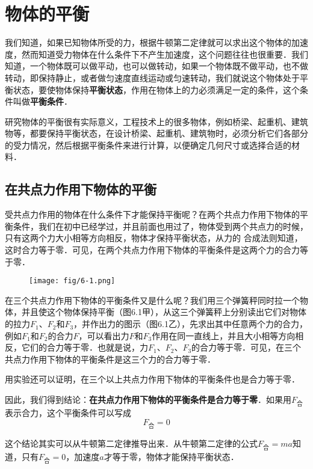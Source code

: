 

\chapter{物体的平衡}

我们知道，如果已知物体所受的力，根据牛顿第二定律就可以求出这个物体的加速度，然而知道受力物体在什么条件下不产生加速度，这个问题往往也很重要．我们知道，一个物体既可以做平动，也可以做转动，如果一个物体既不做平动，也不做转动，即保持静止，或者做匀速度直线运动或匀速转动，我们就说这个物体处于平衡状态，要使物体保持\textbf{平衡状态}，作用在物体上的力必须满足一定的条件，这个条件叫做\textbf{平衡条件}．

研究物体的平衡很有实际意义，工程技术上的很多物体，例如桥梁、起重机、建筑物等，都要保持平衡状态，在设计桥梁、起重机、建筑物时，必须分析它们各部分的受力情况，然后根据平衡条件来进行计算，以便确定几何尺寸或选择合适的材料．

\section{在共点力作用下物体的平衡}
受共点力作用的物体在什么条件下才能保持平衡呢？在两个共点力作用下物体的平衡条件，我们在初中已经学过，并且前面也用过了，物体受到两个共点力的时候，只有这两个力大小相等方向相反，物体才保持平衡状态，从力的
合成法则知道，这时合力等于零．可见，在两个共点力作用下物体的平衡条件是这两个力的合力等于零．
\begin{figure}[htp]
\centering\texttt{[image: fig/6-1.png]}
\caption{}
\end{figure}

在三个共点力作用下物体的平衡条件又是什么呢？我们用三个弹簧秤同时拉一个物体，并且使这个物体保持平衡（图6.1甲），从这三个弹簧秤上分别读出它们对物体的拉力$F_1$、$F_2$和$F_3$，并作出力的图示（图6.1乙），先求出其中任意两个力的合力，例如$F_1$和$F_2$的合力$F$，可以看出力$F$和$F_3$作用在同一直线上，并且大小相等方向相反，它们的合力等于零．也就是说，力$F_1$、$F_2$、$F_3$的合力等于零．可见，在三个共点力作用下物体的平衡条件是这三个力的合力等于零．

用实验还可以证明，在三个以上共点力作用下物体的平衡条件也是合力等于零．

因此，我们得到结论：\textbf{在共点力作用下物体的平衡条件是合力等于零}．如果用$F_{\text{合}}$表示合力，这个平衡条件可以写成
\[F_{\text{合}}=0\] 

这个结论其实可以从牛顿第二定律推导出来．从牛顿第二定律的公式$F_{\text{合}}=ma$知道，只有$F_{\text{合}}=0$，加速度$a$才等于零，物体才能保持平衡状态．

